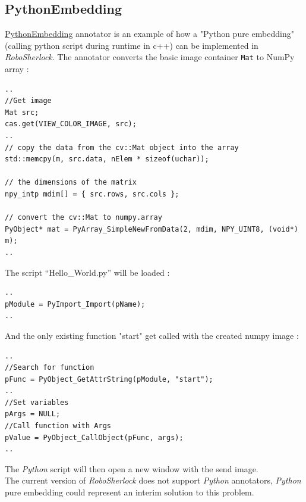 \documentclass[main.tex]{subfiles}
\begin{document}
				\subsection{PythonEmbedding}
\href{https://github.com/SUTURO/suturo_perception/blob/Handcamera_tracking/rs_Athene/src/PythonEmbedding.cpp}{PythonEmbedding} annotator is an example of how a "Python pure embedding" (calling python script during runtime in c++) can be implemented in \textit{RoboSherlock}. The annotator converts the basic image container \texttt{Mat} to NumPy array : 
\begin{lstlisting}
..
//Get image
Mat src;
cas.get(VIEW_COLOR_IMAGE, src);
..
// copy the data from the cv::Mat object into the array
std::memcpy(m, src.data, nElem * sizeof(uchar));

// the dimensions of the matrix
npy_intp mdim[] = { src.rows, src.cols };
    
// convert the cv::Mat to numpy.array
PyObject* mat = PyArray_SimpleNewFromData(2, mdim, NPY_UINT8, (void*) m);
..
\end{lstlisting}

The script “Hello\_World.py” will be loaded :  

\begin{lstlisting}
..
pModule = PyImport_Import(pName);
..
\end{lstlisting}
And the only existing function "start" get called with the created numpy image : 
\begin{lstlisting}
..
//Search for function
pFunc = PyObject_GetAttrString(pModule, "start");
..
//Set variables
pArgs = NULL;
//Call function with Args
pValue = PyObject_CallObject(pFunc, args);
..
\end{lstlisting}
The \textit{Python} script will then open a new window with the send image.\\
The current version of \textit{RoboSherlock} does not support \textit{Python} annotators, \textit{Python} pure embedding could represent an interim solution to this problem.

\endgroup
\end{document}
